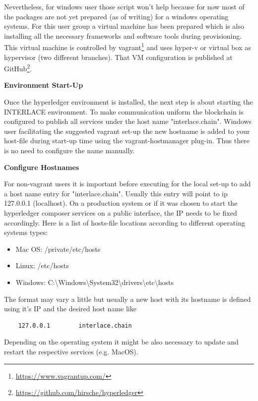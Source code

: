 Nevertheless, for windows user those script won't help because for now most of the packages are not yet prepared (as of writing) for a windows operating systems. For this user group a virtual machine has been prepared which is also installing all the necessary frameworks and software tools during provisioning. This virtual machine is controlled by vagrant\footnote{\url{https://www.vagrantup.com/}} and uses hyper-v or virtual box as hypervisor (two different branches). That VM configuration is published at GitHub\footnote{\url{https://github.com/hirsche/hyperledger}}.

\textbf{Environment Start-Up}

Once the hyperledger environment is installed, the next step is about starting the INTERLACE environment. To make communication uniform the blockchain is configured to publish all services under the host name "interlace.chain". Windows user facilitating the suggested vagrant set-up the new hostname is added to your host-file during start-up time using the vagrant-hostmanager plug-in. Thus there is no need to configure the name manually.

\textbf{Configure Hostnames}

For non-vagrant users it is important before executing for the local set-up to add a host name entry for "interlace.chain". Usually this entry will point to ip 127.0.0.1 (localhost). On a production system or if it was chosen to start the hyperledger composer services on a public interface, the IP needs to be fixed accordingly. Here is a list of hosts-file locations according to different operating systems types:

\begin{itemize}
	\item Mac OS: /private/etc/hosts
    \item Linux: /etc/hosts
    \item Windows: C:\textbackslash Windows\textbackslash System32\textbackslash drivers\textbackslash etc\textbackslash hosts
\end{itemize}

The format may vary a little but usually a new host with its hostname is defined using it's IP and the desired host name like

\begin{lstlisting}
	127.0.0.1        interlace.chain
\end{lstlisting}

Depending on the operating system it might be also necessary to update and restart the respective services (e.g. MacOS).

